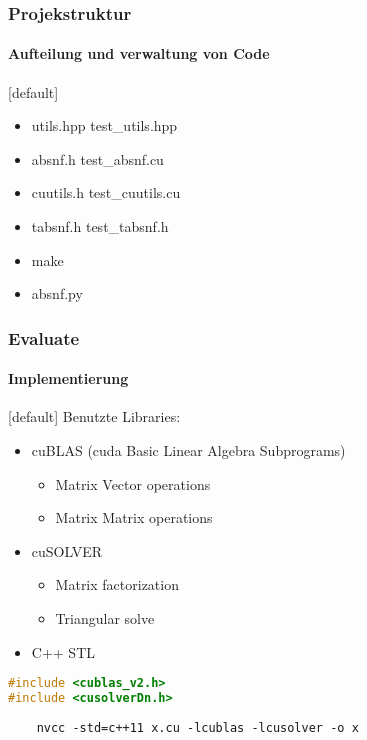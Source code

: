 \begin{frame}
\frametitle{Projekstruktur}
\framesubtitle{Aufteilung und verwaltung von Code}
[default]

\begin{itemize}
	\item utils.hpp test\_utils.hpp
	\item absnf.h test\_absnf.cu
	\item cuutils.h test\_cuutils.cu
	\item tabsnf.h test\_tabsnf.h
	\item make
	\item absnf.py
\end{itemize}

\end{frame}
\begin{frame}[fragile]
	\frametitle{Evaluate}
	\framesubtitle{Implementierung}
	[default]
	Benutzte Libraries:
	\begin{itemize}
		\item cuBLAS (cuda Basic Linear Algebra Subprograms)
		\begin{itemize}
			\item Matrix Vector operations
			\item Matrix Matrix operations
		\end{itemize}
		\item cuSOLVER
		\begin{itemize}
			\item Matrix factorization
			\item Triangular solve
		\end{itemize}
		\item C++ STL
	\end{itemize}
\begin{lstlisting}[language=C++]
#include <cublas_v2.h>
#include <cusolverDn.h>
\end{lstlisting}

\begin{lstlisting}
	nvcc -std=c++11 x.cu -lcublas -lcusolver -o x
\end{lstlisting}
	
\end{frame}
